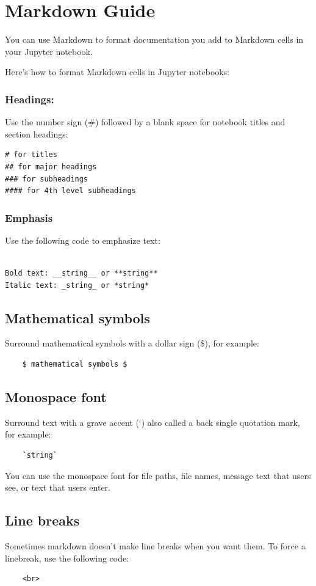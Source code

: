 \chapter{Markdown Guide}


You can use Markdown to format documentation you add to Markdown cells in your Jupyter notebook.

Here's how to format Markdown cells in Jupyter notebooks:

\subsection{Headings:}

Use the number sign (\#) followed by a blank space for notebook titles and section headings:
\begin{verbatim}    
# for titles
## for major headings
### for subheadings
#### for 4th level subheadings
\end{verbatim}

\subsection{Emphasis}
Use the following code to emphasize text:
\begin{verbatim}

Bold text: __string__ or **string**
Italic text: _string_ or *string*
\end{verbatim}

\section{Mathematical symbols}
Surround mathematical symbols with a dollar sign (\$), for example:
\begin{verbatim}
    $ mathematical symbols $
\end{verbatim}

\section{Monospace font}
Surround text with a grave accent (`) also called a back single quotation mark, for example:
\begin{verbatim}
    `string`
\end{verbatim}

You can use the monospace font for file paths, file names, message text that users see, or text that users enter.

\section{Line breaks}
Sometimes markdown doesn’t make line breaks when you want them. To force a linebreak, use the following code: \begin{verbatim}
    <br>
\end{verbatim}

